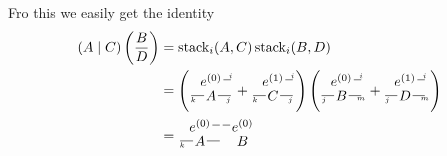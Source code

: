 Fro this we easily get the identity
\begin{align}
\left(A \mid C\right) \left(\frac{B}{D}\right)
&=
\mathrm{stack}_i(A, C)
\,
\mathrm{stack}_i(B, D)
\\&=
\left(
\begin{tikzpicture}[baseline=-.5em, inner sep = 1pt]
    \node (e) at (0, .2) {$e^{(0)}$};
    \draw (e) -- ++(.5,0) node[midway, above right, font=\tiny] {$i$};
    \node (X) at (0, -.2) {$A$};
    \draw (X) -- ++(-.5,0) node[midway, below left, font=\tiny] {$k$};
    \draw (X) -- ++(.5,0) node[midway, below right, font=\tiny] {$j$};
\end{tikzpicture}
+
\begin{tikzpicture}[baseline=-.5em, inner sep = 1pt]
    \node (e) at (0, .2) {$e^{(1)}$};
    \draw (e) -- ++(.5,0) node[midway, above right, font=\tiny] {$i$};
    \node (X) at (0, -.2) {$C$};
    \draw (X) -- ++(-.5,0) node[midway, below left, font=\tiny] {$k$};
    \draw (X) -- ++(.5,0) node[midway, below right, font=\tiny] {$j$};
\end{tikzpicture}
\right)
\left(
\begin{tikzpicture}[baseline=-.5em, inner sep = 1pt]
    \node (e) at (0, .2) {$e^{(0)}$};
    \draw (e) -- ++(.5,0) node[midway, above right, font=\tiny] {$i$};
    \node (X) at (0, -.2) {$B$};
    \draw (X) -- ++(-.5,0) node[midway, below left, font=\tiny] {$j$};
    \draw (X) -- ++(.5,0) node[midway, below right, font=\tiny] {$m$};
\end{tikzpicture}
+
\begin{tikzpicture}[baseline=-.5em, inner sep = 1pt]
    \node (e) at (0, .2) {$e^{(1)}$};
    \draw (e) -- ++(.5,0) node[midway, above right, font=\tiny] {$i$};
    \node (X) at (0, -.2) {$D$};
    \draw (X) -- ++(-.5,0) node[midway, below left, font=\tiny] {$j$};
    \draw (X) -- ++(.5,0) node[midway, below right, font=\tiny] {$m$};
\end{tikzpicture}
\right)
\\&=
\begin{tikzpicture}[baseline=-.5em, inner sep = 1pt]
    \node (e) at (0, .2) {$e^{(0)}$};
    \draw (e) -- ++(.5,0);
    \node (X) at (0, -.2) {$A$};
    \draw (X) -- ++(.5,0);
    \draw (X) -- ++(-.5,0) node[midway, below left, font=\tiny] {$k$};
\end{tikzpicture}
\,
\begin{tikzpicture}[baseline=-.5em, inner sep = 1pt]
    \node (e) at (0, .2) {$e^{(0)}$};
    \draw (e) -- ++(-.5,0);
    \node (X) at (0, -.2) {$B$};

\end{tikzpicture}
\end{align}
